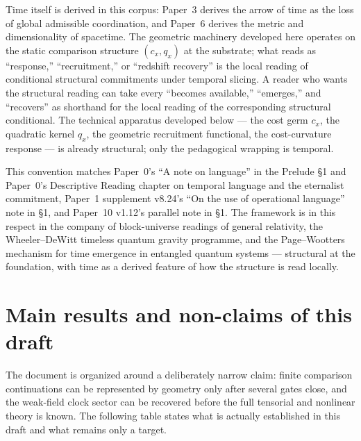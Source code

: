\documentclass[11pt]{article}
\theoremstyle{remark}
\begin{document}
Time itself is derived in this corpus: Paper~3 derives the arrow of time as the loss of global admissible coordination, and Paper~6 derives the metric and dimensionality of spacetime.  The geometric machinery developed here operates on the static comparison structure $(c_x, q_x)$ at the substrate; what reads as ``response,'' ``recruitment,'' or ``redshift recovery'' is the local reading of conditional structural commitments under temporal slicing.  A reader who wants the structural reading can take every ``becomes available,'' ``emerges,'' and ``recovers'' as shorthand for the local reading of the corresponding structural conditional.  The technical apparatus developed below --- the cost germ $c_x$, the quadratic kernel $q_x$, the geometric recruitment functional, the cost-curvature response --- is already structural; only the pedagogical wrapping is temporal.

This convention matches Paper~0's ``A note on language'' in the Prelude \S1 and Paper~0's Descriptive Reading chapter on temporal language and the eternalist commitment, Paper~1 supplement v8.24's ``On the use of operational language'' note in \S1, and Paper~10 v1.12's parallel note in \S1.  The framework is in this respect in the company of block-universe readings of general relativity, the Wheeler--DeWitt timeless quantum gravity programme, and the Page--Wootters mechanism for time emergence in entangled quantum systems --- structural at the foundation, with time as a derived feature of how the structure is read locally.

\section{Main results and non-claims of this draft}
\label{sec:main-results}

The document is organized around a deliberately narrow claim: finite comparison continuations can be represented by geometry only after several gates close, and the weak-field clock sector can be recovered before the full tensorial and nonlinear theory is known.  The following table states what is actually established in this draft and what remains only a target.
\end{document}
